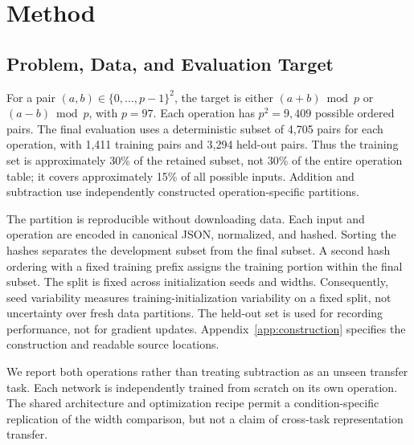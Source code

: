 \documentclass{article}
\begin{document}
\section{Method}
\label{sec:method}

\subsection{Problem, Data, and Evaluation Target}

For a pair $(a,b)\in\{0,\ldots,p-1\}^2$, the target is either $(a+b)\bmod p$ or $(a-b)\bmod p$, with $p=97$. Each operation has $p^2=9,409$ possible ordered pairs. The final evaluation uses a deterministic subset of 4,705 pairs for each operation, with 1,411 training pairs and 3,294 held-out pairs. Thus the training set is approximately 30\% of the retained subset, not 30\% of the entire operation table; it covers approximately 15\% of all possible inputs. Addition and subtraction use independently constructed operation-specific partitions.

The partition is reproducible without downloading data. Each input and operation are encoded in canonical JSON, normalized, and hashed. Sorting the hashes separates the development subset from the final subset. A second hash ordering with a fixed training prefix assigns the training portion within the final subset. The split is fixed across initialization seeds and widths. Consequently, seed variability measures training-initialization variability on a fixed split, not uncertainty over fresh data partitions. The held-out set is used for recording performance, not for gradient updates. Appendix~\ref{app:construction} specifies the construction and readable source locations.

We report both operations rather than treating subtraction as an unseen transfer task. Each network is independently trained from scratch on its own operation. The shared architecture and optimization recipe permit a condition-specific replication of the width comparison, but not a claim of cross-task representation transfer.
\end{document}
